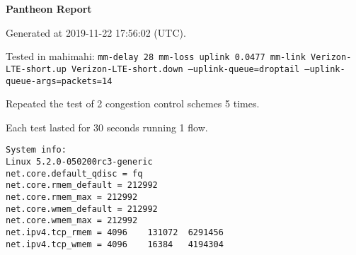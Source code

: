 \documentclass{article}
\begin{document}
\centerline{\textbf{\large{Pantheon Report}}}
\vspace{20pt}

Generated at 2019-11-22 17:56:02 (UTC).

Tested in mahimahi: \texttt{mm-delay 28 mm-loss uplink 0.0477 mm-link Verizon-LTE-short.up Verizon-LTE-short.down --uplink-queue=droptail --uplink-queue-args=packets=14}

Repeated the test of 2 congestion control schemes 5 times.

Each test lasted for 30 seconds running 1 flow.

\begin{verbatim}
System info:
Linux 5.2.0-050200rc3-generic
net.core.default_qdisc = fq
net.core.rmem_default = 212992
net.core.rmem_max = 212992
net.core.wmem_default = 212992
net.core.wmem_max = 212992
net.ipv4.tcp_rmem = 4096	131072	6291456
net.ipv4.tcp_wmem = 4096	16384	4194304
\end{verbatim}
\end{document}
